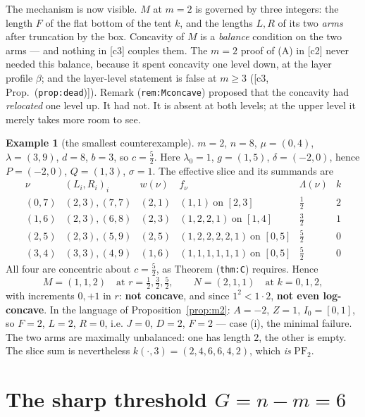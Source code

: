 \documentclass[11pt]{article}
\theoremstyle{definition}
\newtheorem{example}[theorem]{Example}
\newcommand{\PFtwo}{\mathrm{PF}_2}
\begin{document}
The mechanism is now visible. $M$ at $m=2$ is governed by three integers: the length
$F$ of the flat bottom of the tent $k$, and the lengths $L,R$ of its two \emph{arms}
after truncation by the box. Concavity of $M$ is a \emph{balance} condition on the two
arms --- and nothing in [c3] couples them. The $m=2$ proof of (A) in [c2] never needed
this balance, because it spent concavity one level down, at the layer profile $\beta$;
and the layer-level statement is false at $m\ge3$ ([c3, Prop.~(\texttt{prop:dead})]).
Remark (\texttt{rem:Mconcave}) proposed that the concavity had \emph{relocated} one level
up. It had not. It is absent at both levels; at the upper level it merely takes more room
to see.

\begin{example}[the smallest counterexample]\label{ex:small}
$m=2$, $n=8$, $\mu=(0,4)$, $\lambda=(3,9)$, $d=8$, $b=3$, so $c=\tfrac52$. Here
$\lambda_0=1$, $g=(1,5)$, $\delta=(-2,0)$, hence $P=(-2,0)$, $Q=(1,3)$, $\sigma=1$.
The effective slice and its summands are
\[
\begin{array}{c|c|c|c|c|c}
 \nu & (L_i,R_i)_i & w(\nu) & f_\nu & \Lambda(\nu) & k \\\hline
 (0,7) & (2,3),(7,7) & (2,1) & (1,1)\ \text{on }[2,3] & \tfrac12 & 2\\
 (1,6) & (2,3),(6,8) & (2,3) & (1,2,2,1)\ \text{on }[1,4] & \tfrac32 & 1\\
 (2,5) & (2,3),(5,9) & (2,5) & (1,2,2,2,2,1)\ \text{on }[0,5] & \tfrac52 & 0\\
 (3,4) & (3,3),(4,9) & (1,6) & (1,1,1,1,1,1)\ \text{on }[0,5] & \tfrac52 & 0
\end{array}
\]
All four are concentric about $c=\tfrac52$, as Theorem (\texttt{thm:C}) requires. Hence
\[
  M=(1,1,2)\quad\text{at }r=\tfrac12,\tfrac32,\tfrac52,
  \qquad N=(2,1,1)\quad\text{at }k=0,1,2 ,
\]
with increments $0,+1$ in $r$: \textbf{not concave}, and since $1^2<1\cdot2$,
\textbf{not even log-concave}. In the language of Proposition~\ref{prop:m2}:
$A=-2$, $Z=1$, $I_0=[0,1]$, so $F=2$, $L=2$, $R=0$, i.e. $J=0$, $D=2$, $F=2$ --- case
(i), the minimal failure. The two arms are maximally unbalanced: one has length $2$, the
other is empty. The slice sum is nevertheless
$k(\cdot,3)=(2,4,6,6,4,2)$, which \emph{is} $\PFtwo$.
\end{example}

\section{The sharp threshold $G=n-m=6$}\label{sec:threshold}
\end{document}
